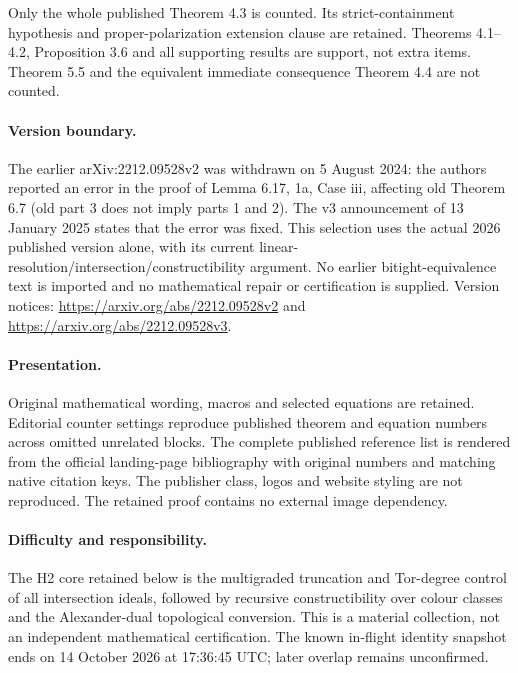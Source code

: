 \documentclass[10pt,a4paper]{article}
\theoremstyle{definition}
\theoremstyle{remark}
\theoremstyle{plain}
\begin{document}
Only the whole published Theorem 4.3 is counted. Its strict-containment hypothesis and proper-polarization extension clause are retained. Theorems 4.1--4.2, Proposition 3.6 and all supporting results are support, not extra items. Theorem 5.5 and the equivalent immediate consequence Theorem 4.4 are not counted.

\paragraph{Version boundary.} The earlier arXiv:2212.09528v2 was withdrawn on 5 August 2024: the authors reported an error in the proof of Lemma 6.17, 1a, Case iii, affecting old Theorem 6.7 (old part 3 does not imply parts 1 and 2). The v3 announcement of 13 January 2025 states that the error was fixed. This selection uses the actual 2026 published version alone, with its current linear-resolution/intersection/constructibility argument. No earlier bitight-equivalence text is imported and no mathematical repair or certification is supplied. Version notices: \url{https://arxiv.org/abs/2212.09528v2} and \url{https://arxiv.org/abs/2212.09528v3}.

\paragraph{Presentation.} Original mathematical wording, macros and selected equations are retained. Editorial counter settings reproduce published theorem and equation numbers across omitted unrelated blocks. The complete published reference list is rendered from the official landing-page bibliography with original numbers and matching native citation keys. The publisher class, logos and website styling are not reproduced. The retained proof contains no external image dependency.

\paragraph{Difficulty and responsibility.} The H2 core retained below is the multigraded truncation and Tor-degree control of all intersection ideals, followed by recursive constructibility over colour classes and the Alexander-dual topological conversion. This is a material collection, not an independent mathematical certification. The known in-flight identity snapshot ends on 14 October 2026 at 17:36:45 UTC; later overlap remains unconfirmed.

\setcounter{section}{1}\setcounter{cdrthm}{0}
\end{document}
